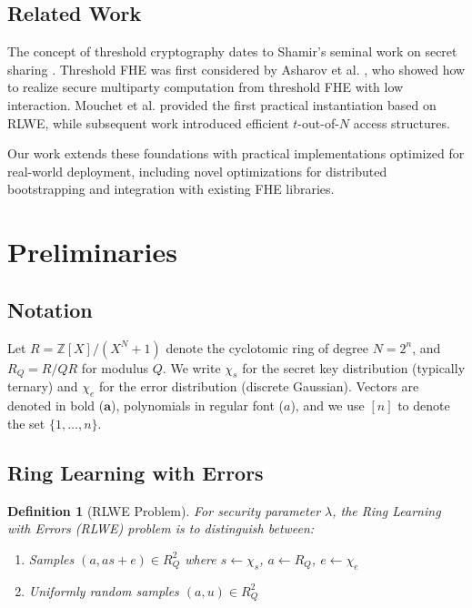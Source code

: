 \documentclass[11pt,a4paper]{article}
\newtheorem{definition}[theorem]{Definition}
\begin{document}
\subsection{Related Work}

The concept of threshold cryptography dates to Shamir's seminal work on secret sharing \cite{shamir1979share}. Threshold FHE was first considered by Asharov et al. \cite{asharov2012multiparty}, who showed how to realize secure multiparty computation from threshold FHE with low interaction. Mouchet et al. \cite{mouchet2021multiparty} provided the first practical instantiation based on RLWE, while subsequent work \cite{mouchet2022threshold} introduced efficient $t$-out-of-$N$ access structures.

Our work extends these foundations with practical implementations optimized for real-world deployment, including novel optimizations for distributed bootstrapping and integration with existing FHE libraries.

\section{Preliminaries}

\subsection{Notation}

Let $R = \mathbb{Z}[X]/(X^N + 1)$ denote the cyclotomic ring of degree $N = 2^n$, and $R_Q = R/QR$ for modulus $Q$. We write $\chi_s$ for the secret key distribution (typically ternary) and $\chi_e$ for the error distribution (discrete Gaussian). Vectors are denoted in bold ($\mathbf{a}$), polynomials in regular font ($a$), and we use $[n]$ to denote the set $\{1, \ldots, n\}$.

\subsection{Ring Learning with Errors}

\begin{definition}[RLWE Problem]
For security parameter $\lambda$, the Ring Learning with Errors (RLWE) problem is to distinguish between:
\begin{enumerate}
    \item Samples $(a, as + e) \in R_Q^2$ where $s \leftarrow \chi_s$, $a \leftarrow R_Q$, $e \leftarrow \chi_e$
    \item Uniformly random samples $(a, u) \in R_Q^2$
\end{enumerate}
\end{definition}
\end{document}
